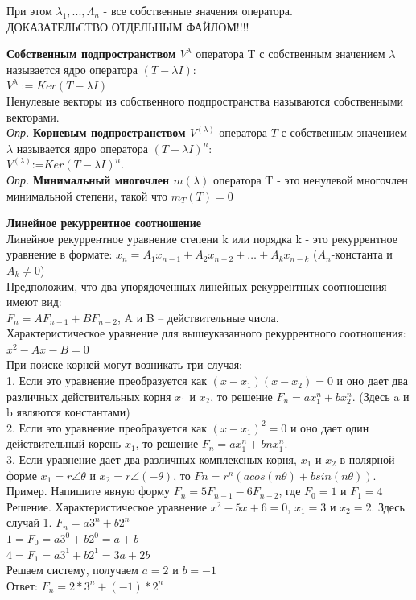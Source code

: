 \documentclass[12pt, oneside]{book}
\theoremstyle{definition}
\begin{document}
\begin{enumerate}
При этом $\lambda_1, ..., \Lambda_n$ - все собственные значения оператора.\\

ДОКАЗАТЕЛЬСТВО ОТДЕЛЬНЫМ ФАЙЛОМ!!!!

\textbf{Собственным подпространством $V^\lambda$} оператора T с собственным значением $\lambda$ называется ядро оператора $(T- \lambda I)$:\\
$V^{\lambda} := Ker(T - \lambda I)$\\
Ненулевые векторы из собственного подпространства называются собственными векторами.\\
\textit{Опр.} \textbf{Корневым подпространством $V^{(\lambda)}$} оператора $T$ с собственным значением $\lambda$ называется ядро оператора $(T- \lambda I)^n$:\\
$V^{(\lambda)}$:=$Ker(T- \lambda I)^n$.\\
\textit{Опр.} \textbf{Минимальный многочлен $m(\lambda)$} оператора T - это ненулевой многочлен минимальной степени, такой что $m_T(T)=0$

\textbf{Линейное рекуррентное соотношение}\\
Линейное рекуррентное уравнение степени k или порядка k - это рекуррентное уравнение в формате: $x_n=A_1x_{n-1}+ A_2x_{n-2}+…+ A_kx_{n-k}$ ($A_n$-константа и $A_k \neq 0$)\\
Предположим, что два упорядоченных линейных рекуррентных соотношения имеют вид:\\
$F_n=AF_{n-1}+BF_{n-2}$, A и B – действительные числа.\\
Характеристическое уравнение для вышеуказанного рекуррентного соотношения: \\
$x^2-Ax-B=0$\\
При поиске корней могут возникать три случая:\\
1.  Если это уравнение преобразуется как $(x - x_1) (x - x_2) = 0$ и оно дает два различных действительных корня $x_1$ и $x_2$, то решение $F_n = ax_1^n + bx_2^n$. (Здесь a и b являются константами)\\
2. Если это уравнение преобразуется как $(x - x_1)^2=0$ и оно дает один действительный корень $x_1$, то решение $F_n = ax_1^n + bnx_1^n$.\\
3. Если уравнение дает два различных комплексных корня, $x_1$ и $x_2$ в полярной форме $x_1 = r \angle \theta$ и $x_2 = r \angle (−\theta )$, то $Fn = r^n (acos (n\theta) + bsin (n\theta))$.\\

Пример. Напишите явную форму $F_n=5F_{n-1}-6F_{n-2}$, где $F_0=1$ и $F_1=4$\\
Решение. Характеристическое уравнение $x^2-5x+6=0$, $x_1=3$ и $x_2=2$. Здесь случай 1. \Rightarrow $F_n=a3^n+b2^n$ \Rightarrow\\
$1=F_0=a3^0+b2^0=a+b$\\
$4=F_1=a3^1+b2^1=3a+2b$\\
Решаем систему, получаем $a=2$ и $b=-1$\\
Ответ: $F_n=2*3^n+(-1)*2^n$



\end{enumerate}
\end{document}
